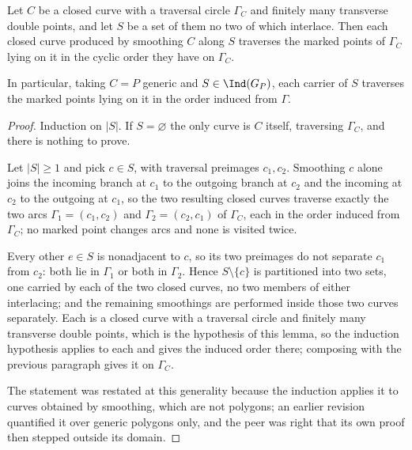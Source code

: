 \begin{lemma}\label{CV:lem:carrierword}\leanok
Let $C$ be a closed curve with a traversal circle $\Gamma_C$ and finitely many
transverse double points, and let $S$ be a set of them no two of which
interlace. Then each closed curve produced by smoothing $C$ along $S$ traverses
the marked points of $\Gamma_C$ lying on it in the cyclic order they have on
$\Gamma_C$.

In particular, taking $C=P$ generic and $S\in\Ind(G_P)$, each carrier of $S$
traverses the marked points lying on it in the order induced from $\Gamma$.
\end{lemma}
\begin{proof}\leanok
Induction on $|S|$. If $S=\varnothing$ the only curve is $C$ itself, traversing
$\Gamma_C$, and there is nothing to prove.

Let $|S|\geq1$ and pick $c\in S$, with traversal preimages $c_1,c_2$. Smoothing
$c$ alone joins the incoming branch at $c_1$ to the outgoing branch at $c_2$ and
the incoming at $c_2$ to the outgoing at $c_1$, so the two resulting closed
curves traverse exactly the two arcs $\Gamma_1=(c_1,c_2)$ and
$\Gamma_2=(c_2,c_1)$ of $\Gamma_C$, each in the order induced from $\Gamma_C$;
no marked point changes arcs and none is visited twice.

Every other $e\in S$ is nonadjacent to $c$, so its two preimages do not separate
$c_1$ from $c_2$: both lie in $\Gamma_1$ or both in $\Gamma_2$. Hence
$S\setminus\{c\}$ is partitioned into two sets, one carried by each of the two
closed curves, no two members of either interlacing; and the remaining
smoothings are performed inside those two curves separately. Each is a closed
curve with a traversal circle and finitely many transverse double points, which
is the hypothesis of this lemma, so the induction hypothesis applies to each and
gives the induced order there; composing with the previous paragraph gives it on
$\Gamma_C$.

The statement was restated at this generality because the induction applies it
to curves obtained by smoothing, which are not polygons; an earlier revision
quantified it over generic polygons only, and the peer was right that its own
proof then stepped outside its domain.
\end{proof}

